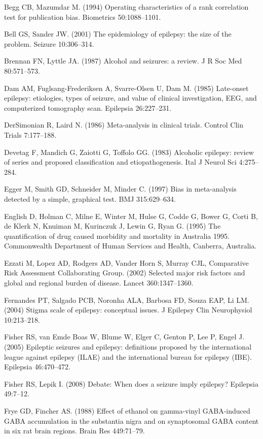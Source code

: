 \documentclass{article}
\begin{document}
Begg CB, Mazumdar M. (1994) Operating characteristics of a rank correlation test for publication bias. Biometrics 50:1088–1101.

Bell GS, Sander JW. (2001) The epidemiology of epilepsy: the size of the problem. Seizure 10:306–314.

Brennan FN, Lyttle JA. (1987) Alcohol and seizures: a review. J R Soc Med 80:571–573.

Dam AM, Fuglsang-Frederiksen A, Svarre-Olsen U, Dam M. (1985) Late-onset epilepsy: etiologies, types of seizure, and value of clinical investigation, EEG, and computerized tomography scan. Epilepsia 26:227–231.

DerSimonian R, Laird N. (1986) Meta-analysis in clinical trials. Control Clin Trials 7:177–188.

Devetag F, Mandich G, Zaiotti G, Toffolo GG. (1983) Alcoholic epilepsy: review of series and proposed classification and etiopathogenesis. Ital J Neurol Sci 4:275–284.

Egger M, Smith GD, Schneider M, Minder C. (1997) Bias in meta-analysis detected by a simple, graphical test. BMJ 315:629–634.

English D, Holman C, Milne E, Winter M, Hulse G, Codde G, Bower G, Corti B, de Klerk N, Knuiman M, Kurinczuk J, Lewin G, Ryan G. (1995) The quantification of drug caused morbidity and mortality in Australia 1995. Commonwealth Department of Human Services and Health, Canberra, Australia.

Ezzati M, Lopez AD, Rodgers AD, Vander Horn S, Murray CJL, Comparative Risk Assessment Collaborating Group. (2002) Selected major risk factors and global and regional burden of disease. Lancet 360:1347–1360.

Fernandes PT, Salgado PCB, Noronha ALA, Barbosa FD, Souza EAP, Li LM. (2004) Stigma scale of epilepsy: conceptual issues. J Epilepsy Clin Neurophysiol 10:213–218.

Fisher RS, van Emde Boas W, Blume W, Elger C, Genton P, Lee P, Engel J. (2005) Epileptic seizures and epilepsy: definitions proposed by the international league against epilepsy (ILAE) and the international bureau for epilepsy (IBE). Epilepsia 46:470–472.

Fisher RS, Lepik I. (2008) Debate: When does a seizure imply epilepsy? Epilepsia 49:7–12.

Frye GD, Fincher AS. (1988) Effect of ethanol on gamma-vinyl GABA-induced GABA accumulation in the substantia nigra and on synaptosomal GABA content in six rat brain regions. Brain Res 449:71–79.
\end{document}
